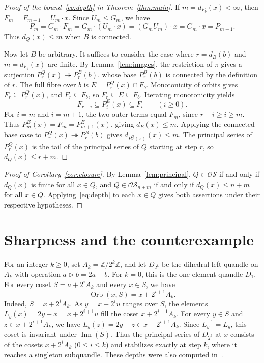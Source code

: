 \documentclass[11pt,a4paper]{article}
\theoremstyle{remark}
\newcommand{\OS}{\mathcal{OS}}
\newcommand{\Inn}{\operatorname{Inn}}
\newcommand{\Orb}{\operatorname{Orb}}
\newcommand{\Z}{\mathbb{Z}}
\newcommand{\conj}{\triangleright}
\begin{document}
\begin{proof}[Proof of the bound~\eqref{eq:depth} in Theorem~\ref{thm:main}]
If \(m=d_{F_b}(x)<\infty\), then \(F_m=F_{m+1}=U_m\cdot x\).
Since \(U_m\le G_m\), we have
\[
  P_m=G_m\cdot F_m=G_m\cdot(U_m\cdot x)=(G_mU_m)\cdot x
  =G_m\cdot x=P_{m+1}.
\]
Thus \(d_Q(x)\le m\) when \(B\) is connected.

Now let \(B\) be arbitrary. It suffices to consider the case where
\(r=d_B(b)\) and \(m=d_{F_b}(x)\) are finite. By Lemma~\ref{lem:images},
the restriction of \(\pi\) gives a surjection
\(P_r^Q(x)\twoheadrightarrow P_r^B(b)\), whose base \(P_r^B(b)\)
is connected by the definition of \(r\). The full fibre over \(b\)
is \(E=P_r^Q(x)\cap F_b\). Monotonicity of orbits gives
\(F_r\subseteq P_r^Q(x)\), and \(F_r\subseteq F_b\), so
\(F_r\subseteq E\subseteq F_b\). Iterating monotonicity yields
\[
  F_{r+i}\subseteq P_i^E(x)\subseteq F_i\qquad(i\ge 0).
\]
For \(i=m\) and \(i=m+1\), the two outer terms equal \(F_m\), since
\(r+i\ge i\ge m\). Thus \(P_m^E(x)=F_m=P_{m+1}^E(x)\), giving
\(d_E(x)\le m\). Applying the connected-base case to
\(P_r^Q(x)\twoheadrightarrow P_r^B(b)\) gives
\(d_{P_r^Q(x)}(x)\le m\). The principal series of \(P_r^Q(x)\) is
the tail of the principal series of \(Q\) starting at step \(r\),
so \(d_Q(x)\le r+m\).
\end{proof}

\begin{proof}[Proof of Corollary~\ref{cor:closure}]
By Lemma~\ref{lem:principal}, \(Q\in\OS\) if and only if \(d_Q(x)\)
is finite for all \(x\in Q\), and \(Q\in\OS_{n+m}\) if and only if
\(d_Q(x)\le n+m\) for all \(x\in Q\). Applying~\eqref{eq:depth} to each
\(x\in Q\) gives both assertions under their respective hypotheses.
\end{proof}

\section{Sharpness and the counterexample}\label{sec:negative}

For an integer \(k\ge 0\), set \(A_k=\Z/2^k\Z\), and let \(D_{2^k}\)
be the dihedral left quandle on \(A_k\) with operation \(a\conj b=2a-b\).
For \(k=0\), this is the one-element quandle \(D_1\). For every coset
\(S=a+2^i A_k\) and every \(x\in S\), we have
\[
  \Orb(x,S)=x+2^{i+1}A_k.
\]
Indeed, \(S=x+2^i A_k\). As \(y=x+2^i u\) ranges over \(S\), the
elements \(L_y(x)=2y-x=x+2^{i+1}u\) fill the coset \(x+2^{i+1}A_k\).
For every \(y\in S\) and \(z\in x+2^{i+1}A_k\), we have
\(L_y(z)=2y-z\in x+2^{i+1}A_k\). Since \(L_y^{-1}=L_y\), this
coset is invariant under \(\Inn(S)\). Thus the principal series
of \(D_{2^k}\) at \(x\) consists of the cosets \(x+2^i A_k\)
(\(0\le i\le k\)) and stabilizes exactly at step \(k\), where it
reaches a singleton subquandle. These depths were also computed
in~\cite[Example~4.1]{BCNW}.
\end{document}
